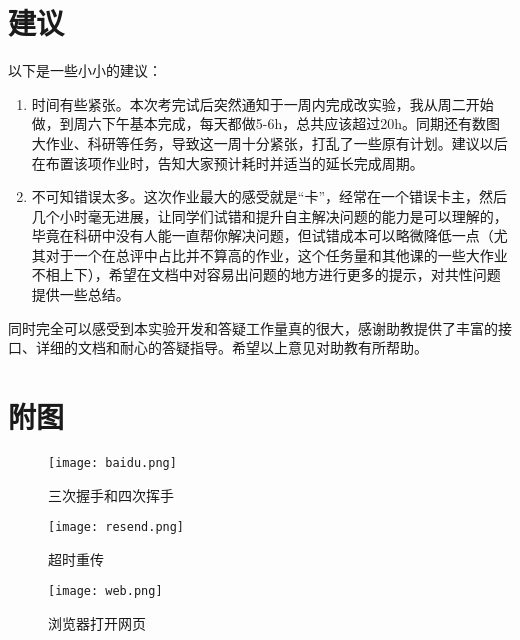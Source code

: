 \documentclass[lang=cn,a4paper]{elegantpaper}
\begin{document}
\section{建议}

\noindent 以下是一些小小的建议：

\begin{enumerate}
  \item 时间有些紧张。本次考完试后突然通知于一周内完成改实验，我从周二开始做，到周六下午基本完成，每天都做5-6h，总共应该超过20h。同期还有数图大作业、科研等任务，导致这一周十分紧张，打乱了一些原有计划。建议以后在布置该项作业时，告知大家预计耗时并适当的延长完成周期。
  \item 不可知错误太多。这次作业最大的感受就是“卡”，经常在一个错误卡主，然后几个小时毫无进展，让同学们试错和提升自主解决问题的能力是可以理解的，毕竟在科研中没有人能一直帮你解决问题，但试错成本可以略微降低一点（尤其对于一个在总评中占比并不算高的作业，这个任务量和其他课的一些大作业不相上下），希望在文档中对容易出问题的地方进行更多的提示，对共性问题提供一些总结。
\end{enumerate}


\noindent 同时完全可以感受到本实验开发和答疑工作量真的很大，感谢助教提供了丰富的接口、详细的文档和耐心的答疑指导。希望以上意见对助教有所帮助。


\section*{附图}

\begin{figure}[H]
  \centering
  \texttt{[image: baidu.png]}
  \caption{三次握手和四次挥手} 
  \label{Fig.1}
\end{figure}

\begin{figure}[H]
  \centering
  \texttt{[image: resend.png]}
  \caption{超时重传} 
  \label{Fig.2}
\end{figure}

\begin{figure}[H]
  \centering
  \texttt{[image: web.png]}
  \caption{浏览器打开网页} 
  \label{Fig.3}
\end{figure}


\nocite{*}
\printbibliography[heading=bibintoc, title=\ebibname]

\appendix
\addappheadtotoc
\end{document}
